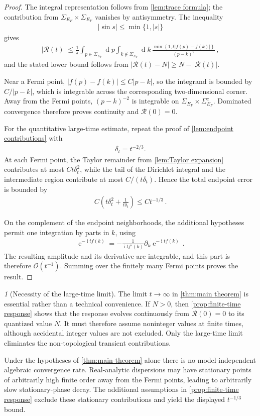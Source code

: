 \documentclass[a4paper,10pt]{article}
\numberwithin{equation}{section}
\theoremstyle{plain}
\theoremstyle{plain}
\theoremstyle{plain}
\theoremstyle{plain}
\theoremstyle{plain}
\theoremstyle{remark}
\newtheorem{rem}[thm]{\protect\remarkname}
\theoremstyle{definition}
\theoremstyle{plain}
\providecommand{\remarkname}{Remark}
\newcommand{\ee}{\operatorname{e}}
\newcommand{\ii}{\operatorname{i}}
\newcommand{\calO}{\mathcal{O}}
\newcommand{\calR}{\mathcal{R}}
\newcommand{\dif}{\operatorname{d}\!} %
\newcommand{\eq}[1]{\begin{align*}#1\end{align*}}
\begin{document}
\begin{proof}
The integral representation follows from \cref{lem:trace formula}; the
contribution from
$\Sigma_{E_F}\times\Sigma_{E_F}$ vanishes by antisymmetry. The inequality
\eq{|\sin s|\leq\min\{1,|s|\}}
gives
\eq{|\calR(t)|
\leq
\frac{1}{\pi}
\int_{p\in\Sigma_{E_F}}\dif{p}
\int_{k\notin\Sigma_{E_F}}\dif{k}\,
\frac{
\min\left\{1,t|f(p)-f(k)|\right\}
}{(p-k)^2}\,,}
and the stated lower bound follows from
$|\calR(t)-N|\geq N-|\calR(t)|$.

Near a Fermi point, $|f(p)-f(k)|\leq C|p-k|$, so the integrand is bounded
by $C/|p-k|$, which is integrable across the corresponding
two-dimensional corner. Away from the Fermi points, $(p-k)^{-2}$ is
integrable on
$\Sigma_{E_F}\times\Sigma_{E_F}^c$. Dominated convergence therefore proves
continuity and $\calR(0)=0$.

For the quantitative large-time estimate, repeat the proof of
\cref{lem:endpoint contributions} with
\eq{\delta_t=t^{-2/3}.}
At each Fermi point, the Taylor remainder from
\cref{lem:Taylor expansion} contributes at most
$Ct\delta_t^2$, while the tail of the Dirichlet integral and the
intermediate region contribute at most $C/(t\delta_t)$. Hence the total
endpoint error is bounded by
\eq{C\left(t\delta_t^2+\frac{1}{t\delta_t}\right)
\leq Ct^{-1/3}\,.}

On the complement of the endpoint neighborhoods, the additional
hypotheses permit one integration by parts in $k$, using
\eq{\ee^{-\ii tf(k)}
=
-\frac{1}{\ii t f'(k)}
\partial_k\ee^{-\ii tf(k)}\,.}
The resulting amplitude and its derivative are integrable, and this part
is therefore $\calO(t^{-1})$. Summing over the finitely many Fermi points
proves the result.
\end{proof}

\begin{rem}[Necessity of the large-time limit]
The limit $t\to\infty$ in \cref{thm:main theorem} is essential rather than
a technical convenience. If $N>0$, then \cref{prop:finite-time response}
shows that the response evolves continuously from $\calR(0)=0$ to its
quantized value $N$. It must therefore assume noninteger values at finite
times, although accidental integer values are not excluded. Only
the large-time limit eliminates the non-topological transient
contributions.

Under the hypotheses of \cref{thm:main theorem} alone there is no
model-independent algebraic convergence rate. Real-analytic dispersions
may have stationary points of arbitrarily high finite order away from the
Fermi points, leading to arbitrarily slow stationary-phase decay. The
additional assumptions in \cref{prop:finite-time response} exclude these
stationary contributions and yield the displayed $t^{-1/3}$ bound.
\end{rem}
\end{document}
